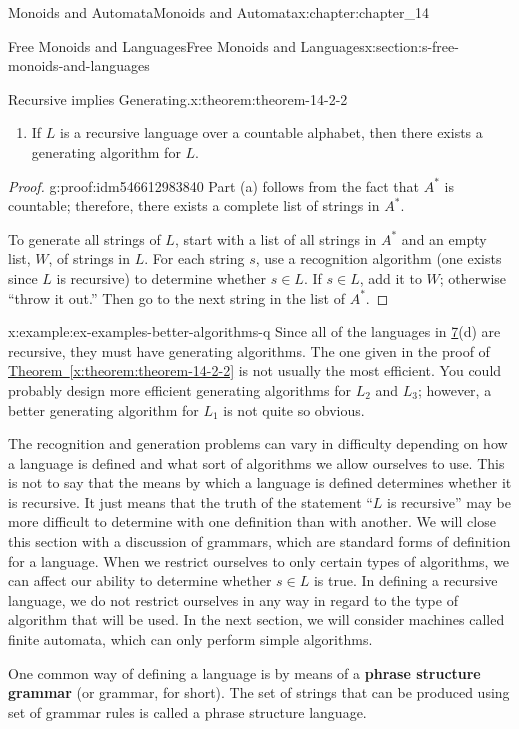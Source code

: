 \documentclass[oneside,10pt,]{book}
\newcommand{\xreffont}{\relax}
\newcommand{\terminology}[1]{\textbf{#1}}
\numberwithin{equation}{section}
\begin{document}
\begin{chapterptx}{Monoids and Automata}{}{Monoids and Automata}{}{}{x:chapter:chapter_14}
\begin{sectionptx}{Free Monoids and Languages}{}{Free Monoids and Languages}{}{}{x:section:s-free-monoids-and-languages}
\begin{theorem}{Recursive implies Generating.}{}{x:theorem:theorem-14-2-2}
\begin{enumerate}[label=(\alph*)]
\item{}If \(L\) is a recursive language over a countable alphabet, then there exists a generating algorithm for \(L\).%
\end{enumerate}
%
\end{theorem}
\begin{proof}{}{g:proof:idm546612983840}
Part (a) follows from the fact that \(A^*\) is countable; therefore, there exists a complete list of strings in \(A^*\).%
\par
To generate all strings of \(L\), start with a list of all strings in \(A^*\) and an empty list, \(W\), of strings in \(L\). For each string \(s\), use a recognition algorithm (one exists since \(L\) is recursive) to determine whether \(s\in L\). If \(s \in L\), add it to \(W\); otherwise ``throw it out.'' Then go to the next string in the list of \(A^*\).%
\end{proof}
\begin{example}{}{x:example:ex-examples-better-algorithms-q}%
Since all of the languages in \hyperref[x:example:ex-some-formal-languages]{7}(d) are recursive, they must have generating algorithms. The one given in the proof of \hyperref[x:theorem:theorem-14-2-2]{Theorem~{\xreffont\ref{x:theorem:theorem-14-2-2}}} is not usually the most efficient. You could probably design more efficient generating algorithms for \(L_2\) and \(L_3\); however, a better generating algorithm for \(L_1\) is not quite so obvious.%
\end{example}
The recognition and generation problems can vary in difficulty depending on how a language is defined and what sort of algorithms we allow ourselves to use. This is not to say that the means by which a language is defined determines whether it is recursive. It just means that the truth of the statement ``\(L\) is recursive'' may be more difficult to determine with one definition than with another. We will close this section with a discussion of grammars, which are standard forms of definition for a language. When we restrict ourselves to only certain types of algorithms, we can affect our ability to determine whether \(s\in L\) is true. In defining a recursive language, we do not restrict ourselves in any way in regard to the type of algorithm that will be used. In the next section, we will consider machines called finite automata, which can only perform simple algorithms.%
\par
One common way of defining a language is by means of a \terminology{phrase structure grammar}  (or grammar, for short). The set of strings that can be produced using set of grammar rules is called a phrase structure language.%

\end{sectionptx}
\end{chapterptx}
\end{document}
